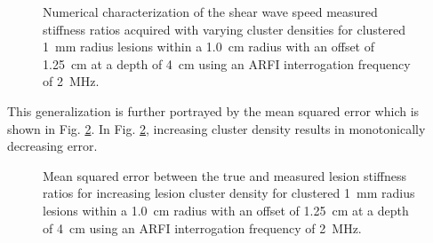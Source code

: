 			\begin{figure}[!htb]
				\centering
				\caption[Numerical characterization of shear wave speed measured stiffness ratio with clustered lesions]{Numerical characterization of the shear wave speed measured stiffness ratios acquired with varying cluster densities for clustered \SI{1}{\mm} radius lesions within a \SI{1.0}{cm} radius with an offset of \SI{1.25}{\cm} at a depth of \SI{4}{\cm} using an ARFI interrogation frequency of \SI{2}{\MHz}.}
				\label{fig:erel_cluster_density}
			\end{figure}

			This generalization is further portrayed by the mean squared error which is shown in Fig. \ref{fig:erel_cluster_density_mse}. In Fig. \ref{fig:erel_cluster_density_mse}, increasing cluster density results in monotonically decreasing error.

			\begin{figure}[!htb]
				\centering
				\caption[Shear-wave speed quantified mean squared error related to small lesion cluster density]{Mean squared error between the true and measured lesion stiffness ratios for increasing lesion cluster density for clustered \SI{1}{\mm} radius lesions within a \SI{1.0}{cm} radius with an offset of \SI{1.25}{\cm} at a depth of \SI{4}{\cm} using an ARFI interrogation frequency of \SI{2}{\MHz}.}
				\label{fig:erel_cluster_density_mse}
			\end{figure}

